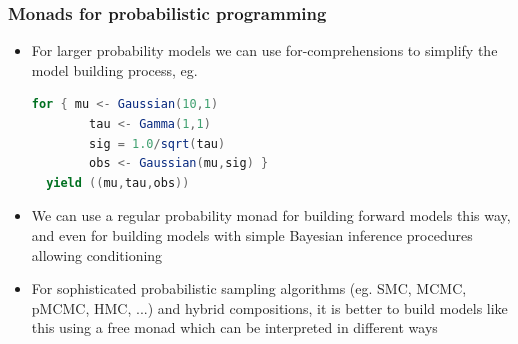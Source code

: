 \documentclass[mathserif,handout]{beamer}
\begin{document}
\begin{frame}[fragile]
  \frametitle{Monads for probabilistic programming}
  \begin{itemize}
    \item For larger probability models we can use \alert{for-comprehensions} to simplify the model building process, eg.
\begin{lstlisting}[language=scala]
  for { mu <- Gaussian(10,1)
        tau <- Gamma(1,1)
        sig = 1.0/sqrt(tau)
        obs <- Gaussian(mu,sig) }
  yield ((mu,tau,obs))
\end{lstlisting}
  \item We can use a regular probability monad for building forward models this way, and even for building models with simple Bayesian inference procedures allowing conditioning
    \item For sophisticated probabilistic sampling algorithms (eg. SMC, MCMC, pMCMC, HMC, ...) and hybrid compositions, it is better to build models like this using a \alert{free monad} which can be \alert{interpreted} in different ways
  \end{itemize}
\end{frame}
\end{document}
